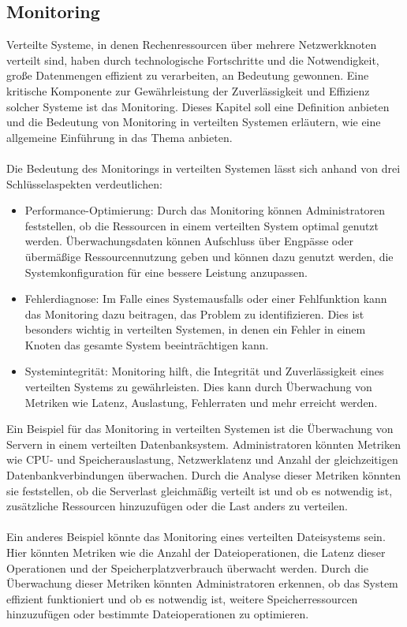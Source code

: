 \subsection{Monitoring}
Verteilte Systeme, in denen Rechenressourcen über mehrere Netzwerkknoten verteilt sind, haben durch technologische Fortschritte und die Notwendigkeit, große Datenmengen effizient zu verarbeiten, an Bedeutung gewonnen. Eine kritische Komponente zur Gewährleistung der Zuverlässigkeit und Effizienz solcher Systeme ist das Monitoring. Dieses Kapitel soll eine Definition anbieten und die Bedeutung von Monitoring in verteilten Systemen erläutern, wie eine allgemeine Einführung in das Thema anbieten. 
\\\\
Die Bedeutung des Monitorings in verteilten Systemen lässt sich anhand von drei Schlüsselaspekten verdeutlichen: 
\begin{itemize}
\item Performance-Optimierung: Durch das Monitoring können Administratoren feststellen, ob die Ressourcen in einem verteilten System optimal genutzt werden. Überwachungsdaten können Aufschluss über Engpässe oder übermäßige Ressourcennutzung geben und können dazu genutzt werden, die Systemkonfiguration für eine bessere Leistung anzupassen.
\item Fehlerdiagnose: Im Falle eines Systemausfalls oder einer Fehlfunktion kann das Monitoring dazu beitragen, das Problem zu identifizieren. Dies ist besonders wichtig in verteilten Systemen, in denen ein Fehler in einem Knoten das gesamte System beeinträchtigen kann.
\item Systemintegrität: Monitoring hilft, die Integrität und Zuverlässigkeit eines verteilten Systems zu gewährleisten. Dies kann durch Überwachung von Metriken wie Latenz, Auslastung, Fehlerraten und mehr erreicht werden.
\end{itemize}
Ein Beispiel für das Monitoring in verteilten Systemen ist die Überwachung von Servern in einem verteilten Datenbanksystem. Administratoren könnten Metriken wie CPU- und Speicherauslastung, Netzwerklatenz und Anzahl der gleichzeitigen Datenbankverbindungen überwachen. Durch die Analyse dieser Metriken könnten sie feststellen, ob die Serverlast gleichmäßig verteilt ist und ob es notwendig ist, zusätzliche Ressourcen hinzuzufügen oder die Last anders zu verteilen.
\\\\
Ein anderes Beispiel könnte das Monitoring eines verteilten Dateisystems sein. Hier könnten Metriken wie die Anzahl der Dateioperationen, die Latenz dieser Operationen und der Speicherplatzverbrauch überwacht werden. Durch die Überwachung dieser Metriken könnten Administratoren erkennen, ob das System effizient funktioniert und ob es notwendig ist, weitere Speicherressourcen hinzuzufügen oder bestimmte Dateioperationen zu optimieren.
